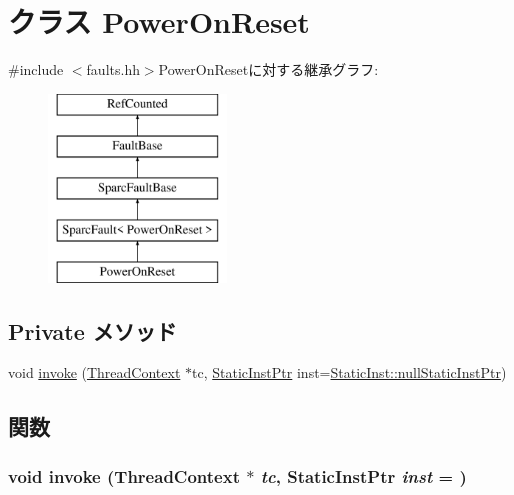 \hypertarget{classSparcISA_1_1PowerOnReset}{
\section{クラス PowerOnReset}
\label{classSparcISA_1_1PowerOnReset}
}


{\ttfamily \#include $<$faults.hh$>$}PowerOnResetに対する継承グラフ:\begin{figure}[H]
\begin{center}
\leavevmode
\includegraphics[height=5cm]{classSparcISA_1_1PowerOnReset}
\end{center}
\end{figure}
\subsection*{Private メソッド}
\begin{DoxyCompactItemize}
\item 
void \hyperlink{classSparcISA_1_1PowerOnReset_a2bd783b42262278d41157d428e1f8d6f}{invoke} (\hyperlink{classThreadContext}{ThreadContext} $\ast$tc, \hyperlink{classRefCountingPtr}{StaticInstPtr} inst=\hyperlink{classStaticInst_aa793d9793af735f09096369fb17567b6}{StaticInst::nullStaticInstPtr})
\end{DoxyCompactItemize}


\subsection{関数}
\hypertarget{classSparcISA_1_1PowerOnReset_a2bd783b42262278d41157d428e1f8d6f}{
\subsubsection[{invoke}]{\setlength{\rightskip}{0pt plus 5cm}void invoke ({\bf ThreadContext} $\ast$ {\em tc}, \/  {\bf StaticInstPtr} {\em inst} = {})}}
\label{classSparcISA_1_1PowerOnReset_a2bd783b42262278d41157d428e1f8d6f}



